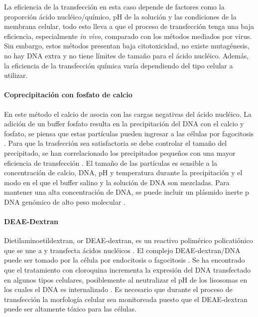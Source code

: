 \documentclass[fleqn,10pt]{SelfArx} %
\begin{document}
La eficiencia de la transfección en esta caso depende de factores como la proporción ácido nucléico/químico, pH de la solución y las condiciones de la membrana celular, todo esto lleva a que el proceso de transfección tenga una baja eficiencia, especialmente \textit{in vivo}, comparado con los métodos mediados por virus. Sin embargo, estos métodos presentan baja citotoxicidad, no existe mutagénesis, no hay DNA extra y no tiene límites de tamaño para el ácido nucléico. Además, la eficiencia de la transfección química varía dependiendo del tipo celular a utilizar.

\paragraph*{Coprecipitación con fosfato de calcio}
En este método el calcio de asocia con las cargas negativas del ácido nucléico. La adición de un buffer fosfato resulta en la precipitación del DNA con el calcio y fosfato, se piensa que estas partículas pueden ingresar a las células por fagocitosis \cite{Loyter:1982aa}. Para que la trasfección sea satisfactoria se debe controlar el tamaño del precipitado, se han correlacionado los precipitados pequeños con una mayor eficiencia de transfección \cite{Jordan:1996aa}. El tamaño de las partículas es sensible a la concentración de calcio, DNA, pH y temperatura durante la precipitación y el modo en el que el buffer salino y la solución de DNA son mezcladas. Para mantener una alta concentración de DNA, se puede incluir un plásmido inerte p DNA genómico de alto peso molecular \cite{Strain:1985aa}.

\paragraph*{DEAE-Dextran}
Dietilaminoetildextran, or DEAE-dextran, es un reactivo polimérico policatiónico que se une a y transfecta ácidos nucléicos \cite{McCutchan:1968aa}.  El complejo DEAE-dextran/DNA puede ser tomado por la célula por endocitosis o fagocitosis \cite{Yang:1997aa, Luthman:1983aa}. Se ha encontrado que el tratamiento con cloroquina incrementa la expresión del DNA transfectado en algunos tipos celulares, posiblemente al neutralizar el pH de los lisosomas en los cuales el DNA es internalizado \cite{Luthman:1983aa}. Es necesario que durante el proceso de transfección la morfología celular sea monitoreada puesto que el DEAE-dextran puede ser altamente tóxico para las células.
\end{document}
